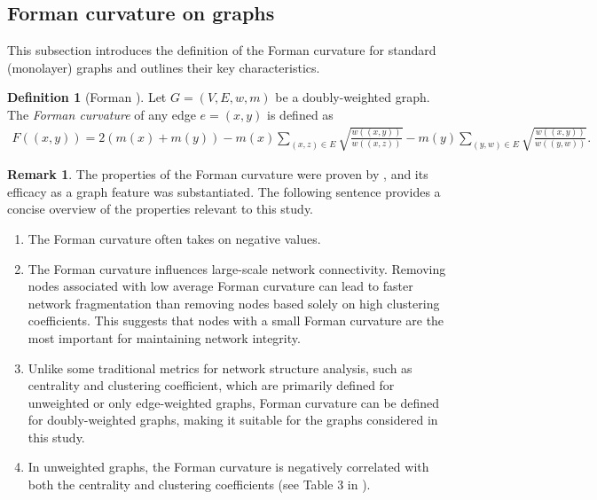 \documentclass[preprint,12pt,number]{elsarticle}
\theoremstyle{plain} %
\theoremstyle{definition} %
\newtheorem{definition}[theorem]{\indent\sc Definition}
\newtheorem{remark}[theorem]{\indent\sc Remark}
\begin{document}
\subsection{Forman curvature on graphs}
This subsection introduces the definition of the Forman curvature for standard (monolayer) graphs and outlines their key characteristics.
\begin{definition}[Forman \cite{forman2003bochner}]
Let $G=(V,E,w,m)$ be a doubly-weighted graph. The \textit{Forman curvature} of any edge $e = (x, y)$ is defined as
\begin{eqnarray*}
F((x,y)) = 2(m(x) +m(y)) - m(x)\sum_{(x,z) \in E} \sqrt{\frac{w((x,y))}{w((x,z))}} - m(y)\sum_{(y,w) \in E}\sqrt{\frac{w((x,y))}{w((y,w))}}.
\end{eqnarray*}
\end{definition}

\begin{remark}
\label{Forman property}
The properties of the Forman curvature were proven by \cite{samal2018comparative, sreejith2016forman}, and its efficacy as a graph feature was substantiated. The following sentence provides a concise overview of the properties relevant to this study.
\begin{enumerate}
\item The Forman curvature often takes on negative values.
\item The Forman curvature influences large-scale network connectivity. Removing nodes associated with low average Forman curvature can lead to faster network fragmentation than removing nodes based solely on high clustering coefficients. This suggests that nodes with a small Forman curvature are the most important for maintaining network integrity.
\item Unlike some traditional metrics for network structure analysis, such as centrality and clustering coefficient, which are primarily defined for unweighted or only edge-weighted graphs, Forman curvature can be defined for doubly-weighted graphs, making it suitable for the graphs considered in this study.
\item In unweighted graphs, the Forman curvature is negatively correlated with both the centrality and clustering coefficients (see Table 3 in \cite{samal2018comparative}).
\end{enumerate}
\end{remark}

\end{document}
